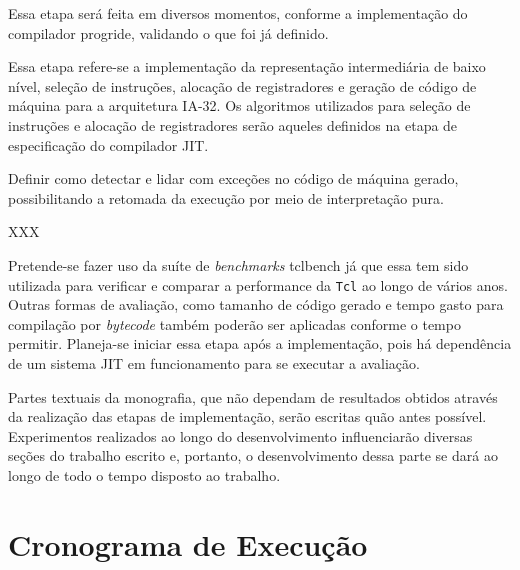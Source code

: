Essa etapa será feita em diversos momentos, conforme a implementação
do compilador progride, validando o que foi já definido.


Essa etapa refere-se a implementação da representação intermediária de
baixo nível, seleção de instruções, alocação de registradores e
geração de código de máquina para a arquitetura IA-32. Os algoritmos
utilizados para seleção de instruções e alocação de registradores
serão aqueles definidos na etapa de especificação do compilador JIT.



Definir como detectar e lidar com exceções no código de máquina gerado,
possibilitando a retomada da execução por meio de interpretação pura.

XXX


Pretende-se fazer uso da suíte de \textit{benchmarks}
tclbench \cite{tcllib_bench} já que essa tem sido utilizada para verificar
e comparar a performance da \texttt{Tcl} ao longo de vários
anos. Outras formas de avaliação, como tamanho de código gerado e
tempo gasto para compilação por \textit{bytecode} também
poderão ser aplicadas conforme o tempo permitir. Planeja-se iniciar
essa etapa após a implementação, pois há dependência de um sistema JIT
em funcionamento para se executar a avaliação.


Partes textuais da monografia, que não dependam de resultados obtidos
através da realização das etapas de implementação, serão escritas quão
antes possível. Experimentos realizados ao longo do desenvolvimento
influenciarão diversas seções do trabalho escrito e, portanto, o
desenvolvimento dessa parte se dará ao longo de todo o tempo disposto
ao trabalho.


\section{Cronograma de Execução}

